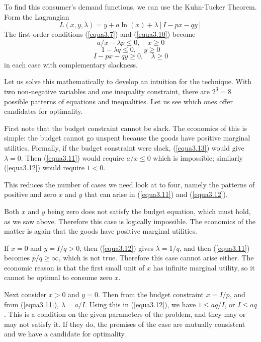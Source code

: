 To find this consumer's demand functions, we can use the Kuhn-Tucker Theorem. Form the Lagrangian
\begin{equation*}
L(x,y,\lambda) = y + a \ln(x) + \lambda[ I - px -qy  ]
\end{equation*}
The first-order conditions (\ref{equa3.7}) and (\ref{equa3.10}) become
\begin{equation} \label{equa3.11}
a/x - \lambda p \leq 0, \quad x \geq 0
\end{equation}
\begin{equation} \label{equa3.12}
1 - \lambda q \leq 0, \quad y \geq 0
\end{equation}
\begin{equation} \label{equa3.13}
I - px - qy \geq 0, \quad \lambda \geq 0
\end{equation}
in each case with complementary slackness.

Let us solve this mathematically to develop an intuition for the technique. With two non-negative variables and one inequality constraint, there are $2^3=8$ possible patterns of equations and inequalities. Let us see which ones offer candidates for optimality.

First note that the budget constraint cannot be slack. The economics of this is simple: the budget cannot go unspent because the goods have positive marginal utilities. Formally, if the budget constraint were slack, (\ref{equa3.13}) would give $\lambda =0$. Then (\ref{equa3.11}) would require $a/x \leq 0$ which is impossible; similarly (\ref{equa3.12}) would require $1<0$.

This reduces the number of cases we need look at to four, namely the patterns of positive and zero $x$ and $y$ that can arise in (\ref{equa3.11}) and (\ref{equa3.12}).

Both $x$ and $y$ being zero does not satisfy the budget equation, which must hold, as we saw above. Therefore this case is logically impossible. The economics of the matter is again that the goods have positive marginal utilities.

If $x=0$ and $y=I/q >0$, then (\ref{equa3.12}) gives $\lambda = 1/q$, and then (\ref{equa3.11}) becomes $p/q \geq \infty$, which is not true. Therefore this case cannot arise either. The economic reason is that the first small unit of $x$ has infinite marginal utility, so it cannot be optimal to consume zero $x$.

Next consider $x>0$ and $y=0$. Then from the budget constraint $x=I/p$, and from (\ref{equa3.11}), $\lambda=a/I$. Using this in (\ref{equa3.12}), we have $1 \leq a q/I$, or $I \leq aq$. This is a condition on the given parameters of the problem, and they may or may not satisfy it. If they do, the premises of the case are mutually consistent and we have a candidate for optimality.

